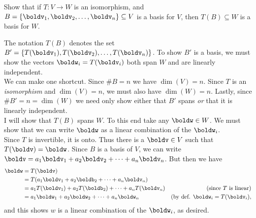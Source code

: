 \ii Show that if $T\colon V\rightarrow W$ is an isomorphism, and $B=\{\boldv_1,\boldv_2,\dots,\boldv_n\}\subseteq V$ is a basis for $V$, then $T(B)\subseteq W$ is a basis for $W$. 
\\
\begin{solution}
\noindent The notation $T(B)$ denotes the set $B'=\{T(\boldv_1),T(\boldv_2),\dots,T(\boldv_n)\}$. To show $B'$ is a basis, we must show the vectors $\boldw_i=T(\boldv_i)$ both span $W$ and are linearly independent. 
\\	
We can make one shortcut. Since $\#B=n$ we have $\dim(V)=n$. Since $T$ is an {\em isomorphism} and $\dim(V)=n$, we must also have $\dim(W)=n$. Lastly, since $\# B'=n=\dim(W)$ we need only show either that $B'$ spans {\em or} that it is linearly independent. 
\\	
I will show that $T(B)$ spans $W$. To this end take any $\boldw\in W$. We must show that we can write $\boldw$ as a linear combination of the $\boldw_i$. 
\\	
Since $T$ is invertible, it is onto. Thus there is a $\boldv\in V$ such that $T(\boldv)=\boldw$. Since $B$ is a basis of $V$, we can write $\boldv=a_1\boldv_1+a_2\boldv_2+\cdots +a_n\boldv_n$. But then we have 
	\begin{align*}
	\boldw&=T(\boldv)\\
	&=T(a_1\boldv_1+a_2\boldb_2+\cdots +a_n\boldv_n)\\
	&=a_1T(\boldv_1)+a_2T(\boldb_2)+\cdots +a_nT(\boldv_n) &\text{(since $T$ is linear)}\\
	&=a_1\boldw_1+a_2\boldw_2+\cdots +a_n\boldw_n &\text{(by def. $\boldw_i=T(\boldv_i)$},
	\end{align*} 
	and this shows $w$ is a linear combination of the $\boldw_i$, as desired. 
	
\end{solution}

\ee